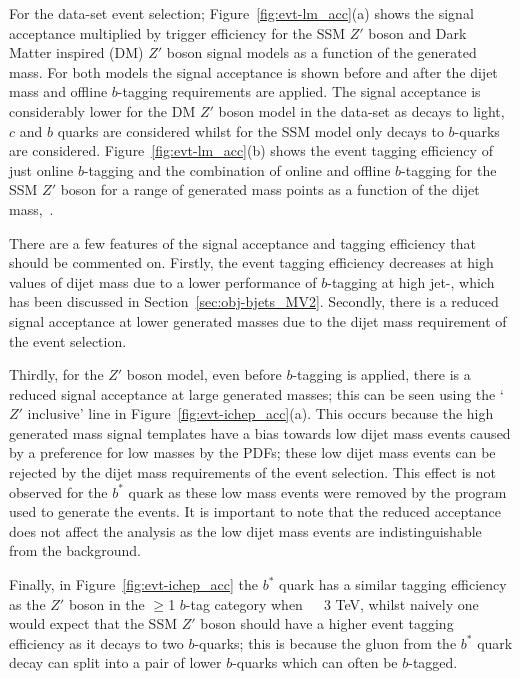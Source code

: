 For the \lm{} data-set event selection;
Figure~\ref{fig:evt-lm_acc}(a) shows the signal acceptance multiplied by trigger efficiency
for the SSM $Z'$ boson and  Dark Matter inspired (DM) $Z'$ boson signal models as a function of the generated mass.
For both models the signal acceptance is shown before and after the
dijet mass and offline $b$-tagging requirements are applied.
The signal acceptance is considerably lower for the DM $Z'$ boson model in the \lm{} data-set
as decays to light, $c$ and $b$ quarks are considered
whilst for the SSM model only decays to $b$-quarks are considered.
Figure~\ref{fig:evt-lm_acc}(b) shows the event tagging efficiency
of just online $b$-tagging and the combination of online and offline $b$-tagging
for the SSM $Z'$ boson for a range of generated mass points
as a function of the dijet mass,~\mjj.

There are a few features of the signal acceptance and tagging efficiency that should be commented on.
Firstly, the event tagging efficiency decreases at high values of dijet mass
due to a lower performance of $b$-tagging at high jet-\pT,
which has been discussed in Section~\ref{sec:obj-bjets_MV2}.
Secondly, there is a reduced signal acceptance at lower generated masses
due to the dijet mass requirement of the event selection.

Thirdly, for the $Z'$ boson model, even before $b$-tagging is applied,
there is a reduced signal acceptance at large generated masses;
this can be seen using the `$Z'$ inclusive' line in Figure~\ref{fig:evt-ichep_acc}(a).
This occurs because the high generated mass signal templates have a bias towards low dijet mass events
caused by a preference for low masses by the PDFs;
these low dijet mass events can be rejected by the dijet mass requirements of the event selection.
This effect is not observed for the $b^*$ quark as these low mass events were removed by the program used to generate the events.
It is important to note that the reduced acceptance does not affect the analysis as
the low dijet mass events are indistinguishable from the background.

Finally, in Figure~\ref{fig:evt-ichep_acc} the $b^*$ quark has a similar tagging efficiency
as the $Z'$ boson in the $\geq$1 $b$-tag category when~\mjj~\gt~3 TeV,
whilst naively one would expect that the SSM $Z'$ boson should have a higher
event tagging efficiency as it decays to two $b$-quarks;
this is because the gluon from the $b^*$ quark decay can split into a pair of lower \pT{} $b$-quarks
which can often be $b$-tagged.

